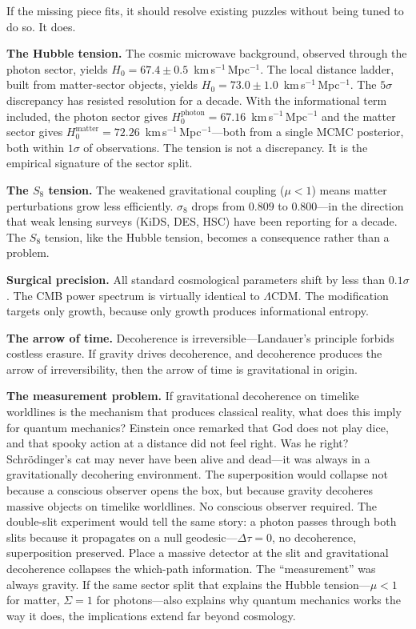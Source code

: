 \documentclass[12pt]{article}
\begin{document}
If the missing piece fits, it should resolve existing puzzles without being
tuned to do so.  It does.

\textbf{The Hubble tension.}  The cosmic microwave background, observed
through the photon sector, yields
$H_0 = 67.4 \pm 0.5$~km\,s$^{-1}$\,Mpc$^{-1}$.  The local distance
ladder, built from matter-sector objects, yields
$H_0 = 73.0 \pm 1.0$~km\,s$^{-1}$\,Mpc$^{-1}$.  The $5\sigma$
discrepancy has resisted resolution for a decade.  With the informational
term included, the photon sector gives
$H_0^{\mathrm{photon}} = 67.16$~km\,s$^{-1}$\,Mpc$^{-1}$ and the matter
sector gives $H_0^{\mathrm{matter}} = 72.26$~km\,s$^{-1}$\,Mpc$^{-1}$---both
from a single MCMC posterior, both within $1\sigma$ of observations.  The
tension is not a discrepancy.  It is the empirical signature of the sector
split.

\textbf{The $S_8$ tension.}  The weakened gravitational coupling
($\mu < 1$) means matter perturbations grow less efficiently.  $\sigma_8$
drops from $0.809$ to $0.800$---in the direction that weak lensing
surveys (KiDS, DES, HSC) have been reporting for a decade.  The $S_8$
tension, like the Hubble tension, becomes a consequence rather than a
problem.

\textbf{Surgical precision.}  All standard cosmological parameters shift
by less than $0.1\sigma$.  The CMB power spectrum is virtually identical to
$\Lambda$CDM.  The modification targets only growth, because only growth
produces informational entropy.

\textbf{The arrow of time.}  Decoherence is irreversible---Landauer's
principle forbids costless erasure.  If gravity drives decoherence, and
decoherence produces the arrow of irreversibility, then the arrow of time
is gravitational in origin.

\textbf{The measurement problem.}  If gravitational decoherence on timelike
worldlines is the mechanism that produces classical reality, what does this
imply for quantum mechanics?  Einstein once remarked that God does not play
dice, and that spooky action at a distance did not feel right.  Was he
right?  Schr\"odinger's cat may never have been alive and dead---it was
always in a gravitationally decohering environment.  The superposition
would collapse not because a conscious observer opens the box, but because
gravity decoheres massive objects on timelike worldlines.  No conscious
observer required.  The double-slit experiment would tell the same story:
a photon passes through both slits because it propagates on a null
geodesic---$\Delta\tau = 0$, no decoherence, superposition preserved.
Place a massive detector at the slit and gravitational decoherence
collapses the which-path information.  The ``measurement'' was always
gravity.  If the same sector split that explains the Hubble
tension---$\mu < 1$ for matter, $\Sigma = 1$ for photons---also explains
why quantum mechanics works the way it does, the implications extend far
beyond cosmology.
\end{document}
